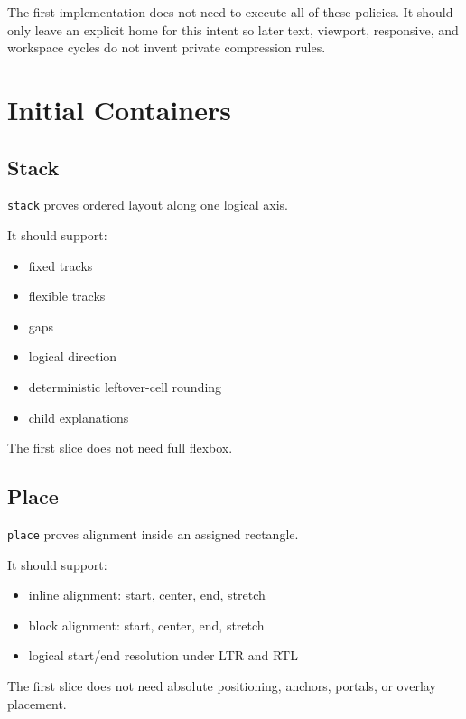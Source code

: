 The first implementation does not need to execute all of these policies. It should only leave an explicit home for this intent so later text, viewport, responsive, and workspace cycles do not invent private compression rules.

\section{Initial Containers}\label{record-163-initial-containers}

\subsection{Stack}\label{record-163-stack}

\texttt{s\allowbreak{}t\allowbreak{}a\allowbreak{}c\allowbreak{}k} proves ordered layout along one logical axis.

It should support:

\begin{itemize}
\tightlist
\item
  fixed tracks
\item
  flexible tracks
\item
  gaps
\item
  logical direction
\item
  deterministic leftover-cell rounding
\item
  child explanations
\end{itemize}

The first slice does not need full flexbox.

\subsection{Place}\label{record-163-place}

\texttt{p\allowbreak{}l\allowbreak{}a\allowbreak{}c\allowbreak{}e} proves alignment inside an assigned rectangle.

It should support:

\begin{itemize}
\tightlist
\item
  inline alignment: start, center, end, stretch
\item
  block alignment: start, center, end, stretch
\item
  logical start/end resolution under LTR and RTL
\end{itemize}

The first slice does not need absolute positioning, anchors, portals, or overlay placement.

